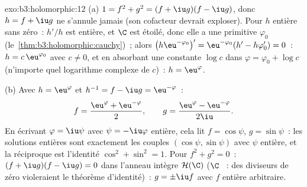 \begin{solution}{exo:b3:holomorphic:12}
(a) $1 = f^2 + g^2 = (f + \iu g)(f - \iu g)$, donc $h = f +
\iu g$ ne s'annule jamais (son cofacteur devrait exploser).
Pour $h$ entière sans zéro~: $h'/h$ est entière, et $\C$ est
étoilé, donc elle a une primitive $\varphi_0$
(le~\cref{thm:b3:holomorphic:cauchy})~; alors
$\bigl(h\eu^{-\varphi_0}\bigr)' = \eu^{-\varphi_0}(h' -
h\varphi_0') = 0$~: $h = c\,\eu^{\varphi_0}$ avec $c \neq
0$, et en absorbant une constante $\log c$ dans $\varphi =
\varphi_0 + \log c$ (n'importe quel logarithme complexe de
$c$)~: $h = \eu^{\varphi}$.

(b) Avec $h = \eu^{\varphi}$ et $h^{-1} = f - \iu g =
\eu^{-\varphi}$~:
\[
f = \frac{\eu^{\varphi} + \eu^{-\varphi}}2,
\qquad
g = \frac{\eu^{\varphi} - \eu^{-\varphi}}{2\iu} .
\]
En écrivant $\varphi = \iu\psi$ avec $\psi = -\iu\varphi$
entière, cela lit $f = \cos\psi$, $g = \sin\psi$~: les
solutions entières sont exactement les couples $(\cos\psi,
\sin\psi)$ avec $\psi$ entière, et la réciproque est
l'identité $\cos^2 + \sin^2 = 1$.
Pour $f^2 + g^2 = 0$~: $(f + \iu g)(f - \iu g) = 0$ dans
l'anneau intègre $\mathcal H(\C)$ ($\C$ ~: des
diviseurs de zéro violeraient le théorème d'identité)~: $g =
\pm\iu f$ avec $f$ entière arbitraire.
\end{solution}

